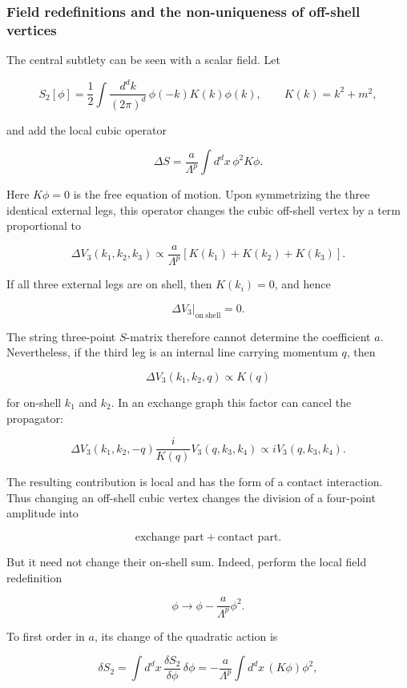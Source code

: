 \documentclass[
  10pt,
  a4paper,
  openany]{book}
\begin{document}
\subsubsection{Field redefinitions and the non-uniqueness of off-shell
vertices}\label{field-redefinitions-and-the-non-uniqueness-of-off-shell-vertices}

The central subtlety can be seen with a scalar field. Let

\[
S_2[\phi]
=\frac12\int\frac{d^dk}{(2\pi)^d}\,
\phi(-k)K(k)\phi(k),
\qquad
K(k)=k^2+m^2,
\]

and add the local cubic operator

\[
\Delta S
=\frac{a}{\Lambda^p}\int d^dx\,
\phi^2 K\phi.
\]

Here \(K\phi=0\) is the free equation of motion. Upon symmetrizing the
three identical external legs, this operator changes the cubic off-shell
vertex by a term proportional to

\[
\Delta V_3(k_1,k_2,k_3)
\propto
\frac{a}{\Lambda^p}
\left[K(k_1)+K(k_2)+K(k_3)\right].
\]

If all three external legs are on shell, then \(K(k_i)=0\), and hence

\[
\left.\Delta V_3\right|_{\mathrm{on\ shell}}=0.
\]

The string three-point \(S\)-matrix therefore cannot determine the
coefficient \(a\). Nevertheless, if the third leg is an internal line
carrying momentum \(q\), then

\[
\Delta V_3(k_1,k_2,q)
\propto K(q)
\]

for on-shell \(k_1\) and \(k_2\). In an exchange graph this factor can
cancel the propagator:

\[
\Delta V_3(k_1,k_2,-q)
\frac{i}{K(q)}
V_3(q,k_3,k_4)
\propto
iV_3(q,k_3,k_4).
\]

The resulting contribution is local and has the form of a contact
interaction. Thus changing an off-shell cubic vertex changes the
division of a four-point amplitude into

\[
\text{exchange part}+\text{contact part}.
\]

But it need not change their on-shell sum. Indeed, perform the local
field redefinition

\[
\phi
\longrightarrow
\phi-\frac{a}{\Lambda^p}\phi^2.
\]

To first order in \(a\), its change of the quadratic action is

\[
\delta S_2
=
\int d^dx\,
\frac{\delta S_2}{\delta\phi}\,\delta\phi
=
-\frac{a}{\Lambda^p}
\int d^dx\,
(K\phi)\phi^2,
\]
\end{document}
